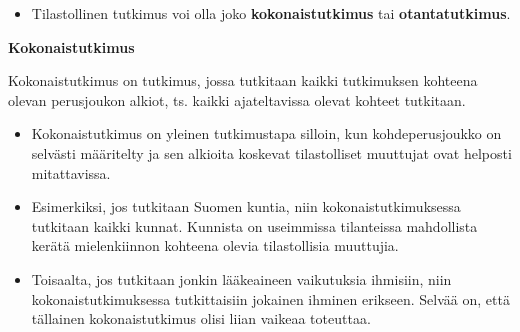 \documentclass[
]{book}
\providecommand{\tightlist}{%
  \setlength{\itemsep}{0pt}\setlength{\parskip}{0pt}}
\begin{document}
\hfill\break

\begin{itemize}
\tightlist
\item
  Tilastollinen tutkimus voi olla joko \textbf{kokonaistutkimus} tai \textbf{otantatutkimus}.
\end{itemize}

\begin{defblock}{}

\textbf{Kokonaistutkimus}

Kokonaistutkimus on tutkimus, jossa tutkitaan kaikki tutkimuksen kohteena olevan perusjoukon alkiot, ts. kaikki ajateltavissa olevat kohteet tutkitaan.

\begin{itemize}
\tightlist
\item
  Kokonaistutkimus on yleinen tutkimustapa silloin, kun kohdeperusjoukko on selvästi määritelty ja sen alkioita koskevat tilastolliset muuttujat ovat helposti mitattavissa.
\item
  Esimerkiksi, jos tutkitaan Suomen kuntia, niin kokonaistutkimuksessa tutkitaan kaikki kunnat. Kunnista on useimmissa tilanteissa mahdollista kerätä mielenkiinnon kohteena olevia tilastollisia muuttujia.
\item
  Toisaalta, jos tutkitaan jonkin lääkeaineen vaikutuksia ihmisiin, niin kokonaistutkimuksessa tutkittaisiin jokainen ihminen erikseen. Selvää on, että tällainen kokonaistutkimus olisi liian vaikeaa toteuttaa.
\end{itemize}

\end{defblock}
\end{document}
